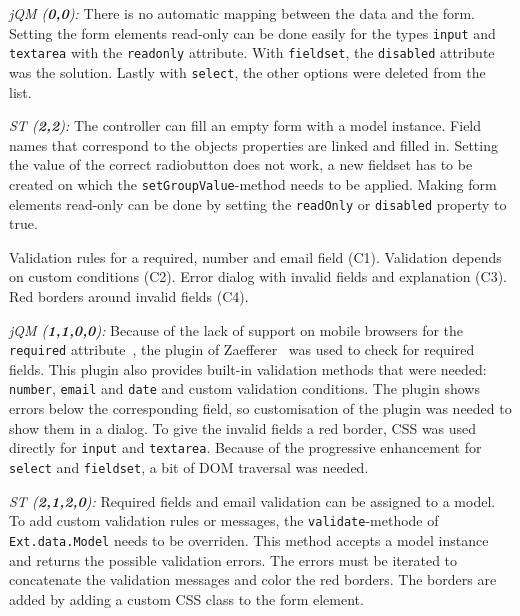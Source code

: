 \documentclass[a4paper]{artikel3}
\newcommand{\code}[1]{\texttt{#1}}
\renewcommand{\paragraph}[1]{\vspace{2mm} \noindent {\bf #1}  }
\newcommand{\framework}[2]{ \emph{#1 (\textbf{#2}): }} %
\newcommand{\challenge}[1]{\paragraph{#1}}
\begin{document}
\framework{jQM}{0,0}
There is no automatic mapping between the data and the form.
Setting the form elements read-only can be done easily for the types \code{input} and \code{textarea} with the \code{readonly} attribute.
With \code{fieldset}, the \code{disabled} attribute was the solution.
Lastly with \code{select}, the other options were deleted from the list.

\framework{ST}{2,2}
The controller can fill an empty form with a model instance.
Field names that correspond to the objects properties are linked and filled in.
Setting the value of the correct radiobutton does not work,  a new fieldset has to be created on which the \code{setGroupValue}-method needs to be applied.  
Making form elements read-only can be done by setting the \code{readOnly} or \code{disabled} property to true.

\challenge{Form validation (C1,C2,C3,C4)}
Validation rules for a required, number and email field (C1).
Validation depends on custom conditions (C2).
Error dialog with invalid fields and explanation (C3).
Red borders around invalid fields (C4).

\framework{jQM}{1,1,0,0}
Because of the lack of support on mobile browsers for the \code{required} attribute~\cite{Deveria2013}, the plugin of Zaefferer~\cite{Zaefferer2013} was used to check for required fields.
This plugin also provides built-in validation methods that were needed: \code{number}, \code{email} and \code{date} and custom validation conditions.
The plugin shows errors below the corresponding field, so customisation of the plugin was needed to show them in a dialog.
To give the invalid fields a red border, CSS was used directly for \code{input} and \code{textarea}.
Because of the progressive enhancement for \code{select} and \code{fieldset}, a bit of DOM traversal was needed.

\framework{ST}{2,1,2,0}
Required fields and email validation can be assigned to a model.  
To add custom validation rules or messages,  the \code{validate}-methode of \code{Ext.data.Model} needs to be overriden.  
This method accepts a model instance and returns the possible validation errors.  
The errors must be iterated to concatenate the validation messages and color the red borders.
The borders are added by adding a custom CSS class to the form element.
\end{document}
